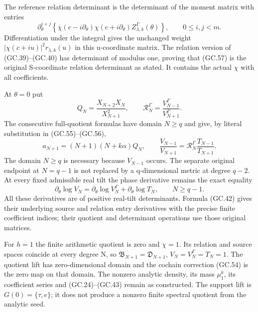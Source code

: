 The reference relation determinant is the determinant of the
moment matrix with entries
\[
 \partial_\theta^{i+j}\left\{
  \overline\chi(c-i\partial_\theta)\chi(c+i\partial_\theta)
                  Z_{\lambda,k}^\Gamma(\theta)\right\},
       \qquad0\le i,j<m.                                     \tag{GC.57}
\]
Differentiation under the integral gives the unchanged weight
$|\chi(c+iu)|^2r_{\lambda,k}(u)$ in this u-coordinate matrix.
The relation version of (GC.39)--(GC.40) has determinant of modulus
one, proving that (GC.57) is the original S-coordinate relation
determinant as stated. It contains the actual $\chi$ with all coefficients.

At $\theta=0$ put
\[
 Q_N=\frac{X_{N+2}X_N}{X_{N+1}^2},\qquad
 \mathcal R_N^\Gamma=\frac{V_{N-1}^\Gamma}{V_{N+1}^\Gamma}.
\]
The consecutive full-quotient formulas have domain $N\ge q$ and
give, by literal substitution in (GC.55)--(GC.56),
\[
 a_{N+1}=(N+1)(N+k\alpha)Q_N,\qquad
 \frac{V_{N-1}}{V_{N+1}}
     =\mathcal R_N^\Gamma\frac{T_{N-1}}{T_{N+1}}.
                                                               \tag{GC.58}
\]
The domain $N\ge q$ is necessary because $V_{N-1}$ occurs. The
separate original endpoint at $N=q-1$ is not replaced by a
q-dimensional metric at degree $q-2$. At every fixed admissible
real tilt the phase derivative remains the exact equality
\[
 \partial_\theta\log V_N
   =\partial_\theta\log V_N^\Gamma+
                              \partial_\theta\log T_N,
                       \qquad N\ge q-1.                       \tag{GC.59}
\]
All these derivatives are of positive real-tilt determinants. Formula
(GC.42) gives their underlying source and relation entry derivatives
with the precise finite coefficient indices; their quotient and
determinant operations use those original matrices.

For $h=1$ the finite arithmetic quotient is zero and $\chi=1$.
Its relation and source spaces coincide at every degree N, so
$\mathfrak B_{N+1}=\mathfrak D_{N+1}$,
$V_N=V_N^\Gamma=T_N=1$. The quotient lift has zero-dimensional
domain and the cochain correction (GC.54) is the zero map on that
domain. The nonzero analytic density, its mass $\mu_1^k$, its
coefficient series and (GC.24)--(GC.43) remain as constructed.
The support lift is $G(0)=\{\tau,e\}$; it does not produce a
nonzero finite spectral quotient from the analytic seed.


\endgroup
